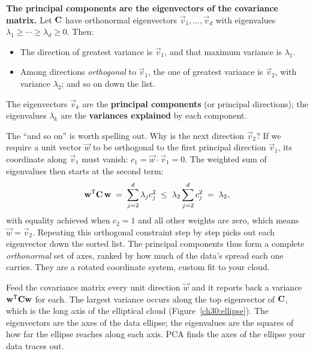 \begin{formalbox}\label{ch30:pca-thm}
\textbf{The principal components are the eigenvectors of the covariance matrix.}
Let $\mathbf{C}$ have orthonormal eigenvectors $\vec v_1,\dots,\vec v_d$ with
eigenvalues $\lambda_1\ge\cdots\ge\lambda_d\ge0$. Then:
\begin{itemize}
  \item The direction of greatest variance is $\vec v_1$, and that maximum variance
        is $\lambda_1$.
  \item Among directions \emph{orthogonal} to $\vec v_1$, the one of greatest
        variance is $\vec v_2$, with variance $\lambda_2$; and so on down the list.
\end{itemize}
The eigenvectors $\vec v_k$ are the \textbf{principal components} (or principal
directions); the eigenvalues $\lambda_k$ are the \textbf{variances explained} by
each component.
\end{formalbox}

The ``and so on'' is worth spelling out. Why is the next direction $\vec v_2$?
If we require a unit vector $\vec w$ to be orthogonal to the first principal
direction $\vec v_1$, its coordinate along $\vec v_1$ must vanish:
$c_1 = \vec w\cdot\vec v_1 = 0$. The weighted sum of eigenvalues then starts at
the second term:
\[
  \mathbf{w}^{\mathsf{T}}\mathbf{C}\,\mathbf{w} \;=\; \sum_{j=2}^d \lambda_j c_j^2
  \;\le\; \lambda_2 \sum_{j=2}^d c_j^2 \;=\; \lambda_2 ,
\]
with equality achieved when $c_2 = 1$ and all other weights are zero, which means
$\vec w = \vec v_2$. Repeating this orthogonal constraint step by step picks out
each eigenvector down the sorted list. The principal components thus form a complete
\emph{orthonormal} set of axes, ranked by how much of the data's spread each one
carries. They are a rotated coordinate system, custom fit to your cloud.

\begin{intuitionbox}
Feed the covariance matrix every unit direction $\vec w$ and it reports back a
variance $\mathbf{w}^{\mathsf{T}}\mathbf{C}\mathbf{w}$ for each. The largest variance occurs along the top
eigenvector of $\mathbf{C}$, which is the long axis of the elliptical cloud
(Figure~\ref{ch30:ellipse}). The eigenvectors are the axes of the data ellipse; the
eigenvalues are the squares of how far the ellipse reaches along each axis. PCA
finds the axes of the ellipse your data traces out.
\end{intuitionbox}

